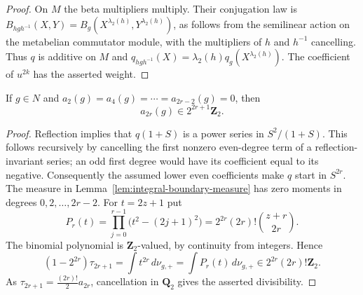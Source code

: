 \begin{proof}
On $M$ the beta multipliers multiply.  Their conjugation law is
$B_{hgh^{-1}}(X,Y)=B_g(X^{\lambda_2(h)},Y^{\lambda_2(h)})$,
as follows from the semilinear action on the metabelian commutator
module, with the multipliers of $h$ and $h^{-1}$ cancelling.
Thus $q$ is additive on $M$ and
$q_{hgh^{-1}}(X)=\lambda_2(h)q_g(X^{\lambda_2(h)})$.
The coefficient of $u^{2k}$ has the asserted weight.
\end{proof}

\begin{lemma}
\label{lem:uniform-odd-coordinate-bound}
If $g\in N$ and $a_2(g)=a_4(g)=\cdots=a_{2r-2}(g)=0$, then
\[
 a_{2r}(g)\in2^{2r+1}\mathbf Z_2.
\]
\end{lemma}
\begin{proof}
Reflection implies that $q(1+S)$ is a power series in
$S^2/(1+S)$.  This follows recursively by cancelling the first
nonzero even-degree term of a reflection-invariant series; an odd
first degree would have its coefficient equal to its negative.
Consequently the assumed lower even coefficients make $q$ start in
$S^{2r}$.  The measure in Lemma~\ref{lem:integral-boundary-measure}
has zero moments in degrees $0,2,\ldots,2r-2$.
For $t=2z+1$ put
\[
 P_r(t)=\prod_{j=0}^{r-1}\bigl(t^2-(2j+1)^2\bigr)
 =2^{2r}(2r)!\binom{z+r}{2r}.
\]
The binomial polynomial is $\mathbf Z_2$-valued, by continuity from
integers.  Hence
\[
 (1-2^{2r})\tau_{2r+1}
 =\int t^{2r}\,d\nu_{g,+}
 =\int P_r(t)\,d\nu_{g,+}
 \in2^{2r}(2r)!\mathbf Z_2.
\]
As $\tau_{2r+1}=\frac{(2r)!}{2}a_{2r}$, cancellation in
$\mathbf Q_2$ gives the asserted divisibility.
\end{proof}

